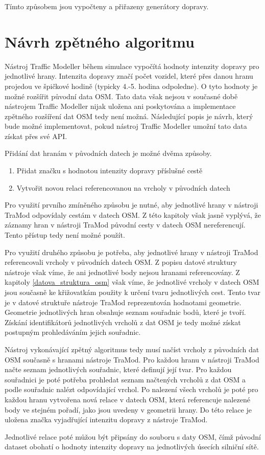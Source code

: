 Tímto způsobem jsou vypočteny a přiřazeny generátory dopravy.

\section{Návrh zpětného algoritmu}
\label{navrh_zpetneho_algoritmu}

Nástroj Traffic Modeller během simulace vypočítá hodnoty intenzity dopravy pro jednotlivé hrany. Intenzita dopravy značí počet vozidel, které přes danou hranu projedou ve špičkové hodině (typicky 4.-5. hodina odpoledne). O tyto hodnoty je možné rozšířit původní data OSM. Tato data však nejsou v současné době nástrojem Traffic Modeller nijak uložena ani poskytována a implementace zpětného rozšíření dat OSM tedy není možná. Následující popis je návrh, který bude možné implementovat, pokud nástroj Traffic Modeller umožní tato data získat přes své API.

Přidání dat hranám v původních datech je možné dvěma způsoby.

\begin{enumerate}
  \item Přidat značku s hodnotou intenzity dopravy příslušné cestě
  \item Vytvořit novou relaci referencovanou na vrcholy v původních datech
  \end{enumerate}

Pro využití prvního zmíněného způsobu je nutné, aby jednotlivé hrany v nástroji TraMod odpovídaly cestám v datech OSM. Z této kapitoly však jasně vyplývá, že záznamy hran v nástroji TraMod původní cesty v datech OSM nereferencují. Tento přístup tedy není možné použít. 

Pro využití druhého způsobu je potřeba, aby jednotlivé hrany v nástroji TraMod referencovali vrcholy v původních datech OSM. Z popisu datové struktury nástroje však víme, že ani jednotlivé body nejsou hranami referencovány. Z kapitoly \ref{datova_struktura_osm} však víme, že jednotlivé vrcholy v datech OSM jsou současně ke křižovatkám použity k určení tvaru jednotlivých cest. Tento tvar je v datové struktuře nástroje TraMod reprezentován hodnotami geometrie. Geometrie jednotlivých hran obsahuje seznam souřadnic bodů, které je tvoří. Získání identifikátorů jednotlivých vrcholů z dat OSM je tedy možné získat postupným prohledáváním jejich souřadnic. 

Nástroj vykonávající zpětný algoritmus tedy musí načíst vrcholy z původních dat OSM současně s hranami nástroje TraMod. Pro každou hranu v nástroji TraMod načte seznam jednotlivých souřadnic, které definují její tvar. Pro každou souřadnici je poté potřeba prohledat seznam načtených vrcholů z dat OSM a podle souřadnic nalézt odpovídající vrchol. Po nalezení všech vrcholů je poté pro každou hranu vytvořena nová relace v datech OSM, která referencuje nalezené body ve stejném pořadí, jako jsou uvedeny v geometrii hrany. Do této relace je uložena značka vyjadřující intenzitu dopravy z nástroje TraMod. 

Jednotlivé relace poté můžou být připsány do souboru s daty OSM, čímž původní dataset obohatí o hodnoty intenzity dopravy na jednotlivých úsecích silniční sítě. 

















